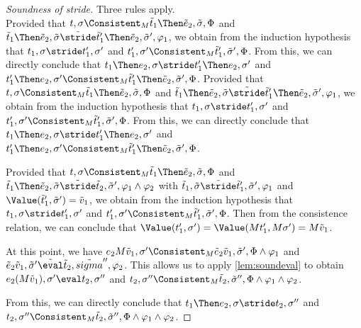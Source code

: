 \begin{proof}[Soundness of stride]
 {
Three rules apply.\\
   {
     Provided that $t,\sigma\Consistent_M\tilde{t}_1\Then \tilde{e}_2,\tilde{\sigma},\Phi$
     and $\tilde{t}_1\Then \tilde{e}_2,\tilde{\sigma}\tilde{\stride}\tilde{t}'_1\Then \tilde{e}_2,\tilde{\sigma}',\phi_1$,
     we obtain from the induction hypothesis that $t_1,\sigma\stride t_1',\sigma'$ and $t_1',\sigma'\Consistent_M\tilde{t}_1',\tilde{\sigma}',\Phi$.
     From this, we can directly conclude that $t_1\Then e_2,\sigma\stride t_1'\Then e_2,\sigma'$ and $t_1'\Then e_2,\sigma'\Consistent_M\tilde{t}_1'\Then\tilde{e}_2,\tilde{\sigma}',\Phi$.
  }
   { Provided that $t,\sigma\Consistent_M\tilde{t}_1\Then \tilde{e}_2,\tilde{\sigma},\Phi$
   and $\tilde{t}_1\Then \tilde{e}_2,\tilde{\sigma}\tilde{\stride}\tilde{t}'_1\Then \tilde{e}_2,\tilde{\sigma}',\phi_1$,
   we obtain from the induction hypothesis that $t_1,\sigma\stride t_1',\sigma'$ and $t_1',\sigma'\Consistent_M\tilde{t}_1',\tilde{\sigma}',\Phi$.
   From this, we can directly conclude that $t_1\Then e_2,\sigma\stride t_1'\Then e_2,\sigma'$ and $t_1'\Then e_2,\sigma'\Consistent_M\tilde{t}_1'\Then\tilde{e}_2,\tilde{\sigma}',\Phi$.
   }
   {Provided that $t,\sigma\Consistent_M\tilde{t}_1\Then \tilde{e}_2,\tilde{\sigma},\Phi$
   and $\tilde{t}_1\Then \tilde{e}_2,\tilde{\sigma}\tilde{\stride}\tilde{t}_2,\tilde{\sigma}',\phi_1\land\phi_2$
   with $\tilde{t}_1,\tilde{\sigma}\tilde{\stride}\tilde{t}_1',\tilde{\sigma}',\phi_1$ and $\Value(\tilde{t}_1',\tilde{\sigma}')=\tilde{v}_1$,
   we obtain from the induction hypothesis that $t_1,\sigma\stride t_1',\sigma'$ and $t_1',\sigma'\Consistent_M\tilde{t}_1',\tilde{\sigma}',\Phi$.
   Then from the consistence relation, we can conclude that $\Value(t_1',\sigma')=\Value(M t_1',M \sigma')=M\tilde{v}_1$.

   At this point, we have $e_2 M\tilde{v}_1,\sigma'\Consistent_M\tilde{e}_2 \tilde{v}_1,\tilde{\sigma}',\Phi\land\phi_1$ and $\tilde{e}_2 \tilde{v}_1,\tilde{\sigma}'\tilde{\eval}\tilde{t}_2,\tilde{sigma}'',\phi_2$.
   This allows us to apply \cref{lem:soundeval} to obtain $e_2 (M\tilde{v}_1),\sigma'\eval t_2,\sigma''$ and $t_2,\sigma''\Consistent_M\tilde{t}_2,\tilde{\sigma}'',\Phi\land\phi_1\land\phi_2$.

   From this, we can directly conclude that $t_1\Then e_2,\sigma\stride t_2,\sigma''$ and $t_2,\sigma''\Consistent_M\tilde{t}_2,\tilde{\sigma}'',\Phi\land\phi_1\land\phi_2$.

}}
\end{proof}
